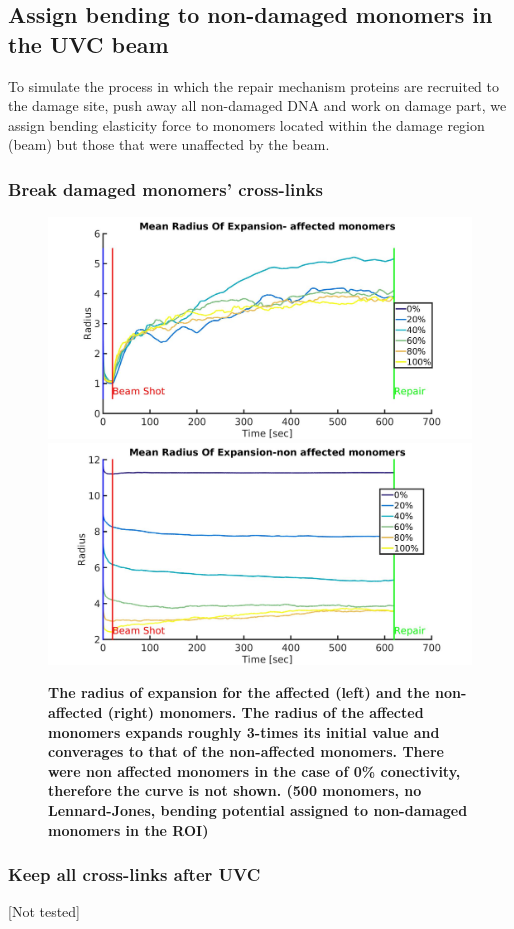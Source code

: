 \documentclass[12pt]{report}
\begin{document}
    
	\subsection{Assign bending to non-damaged monomers in the UVC beam}	
	 To simulate the process in which the repair mechanism proteins are recruited to the damage site, push away all non-damaged DNA and work on damage part, we assign bending elasticity force to monomers located within the damage region (beam) but those that were unaffected by the beam.
	 \subsubsection{Break damaged monomers' cross-links}
	 	 
	\begin{figure}[H]
	\includegraphics[width=0.5\linewidth, height=0.3\textheight]{Images/expandNonDamagedInBeam/breakDamagedCrosslinks/meanRadiusOfExpansionAffected}
	\includegraphics[width=0.5\linewidth, height=0.3\textheight]{Images/expandNonDamagedInBeam/breakDamagedCrosslinks/meanRadiusOfExpansionNonAffected}
	\caption{\tiny{\textbf{The radius of expansion for the affected (left) and the non-affected (right) monomers. The radius of the affected monomers expands roughly 3-times its initial value and converages to that of the non-affected monomers. There were non affected monomers in the case of 0\% conectivity, therefore the curve is not shown. (500 monomers, no Lennard-Jones, bending potential assigned to non-damaged monomers in the ROI)}}}
	\label{fig:meanRadiusOfExpansionAffected}
	\end{figure}
	 
	 \subsubsection{Keep all cross-links after UVC}
	 [Not tested]
	 
\end{document}
